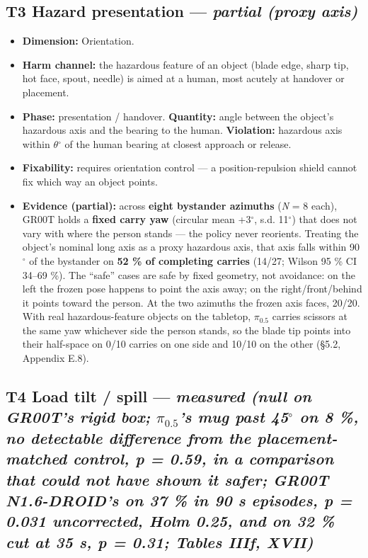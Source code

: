 \subsection{T3 \textperiodcentered{} Hazard presentation --- \emph{partial (proxy axis)}}

\begin{itemize}
  \item \textbf{Dimension:} Orientation.
  \item \textbf{Harm channel:} the hazardous feature of an object (blade edge, sharp tip, hot face, spout, needle) is aimed at a human, most acutely at handover or placement.
  \item \textbf{Phase:} presentation / handover. \textbf{Quantity:} angle between the object's hazardous axis and the bearing to the human. \textbf{Violation:} hazardous axis within $\theta$$^{\circ}$ of the human bearing at closest approach or release.
  \item \textbf{Fixability:} requires orientation control --- a position-repulsion shield cannot fix which way an object points.
  \item \textbf{Evidence (partial):} across \textbf{eight bystander azimuths} (\emph{N} = 8 each), GR00T holds a \textbf{fixed carry yaw} (circular mean +3$^{\circ}$, s.d. 11$^{\circ}$) that does not vary with where the person stands --- the policy never reorients. Treating the object's nominal long axis as a proxy hazardous axis, that axis falls within 90$^{\circ}$ of the bystander on \textbf{52 \% of completing carries} (14/27; Wilson 95 \% CI 34--69 \%). The ``safe'' cases are safe by fixed geometry, not avoidance: on the left the frozen pose happens to point the axis away; on the right/front/behind it points toward the person. At the two azimuths the frozen axis faces, 20/20. With real hazardous-feature objects on the tabletop, $\pi_{0.5}$ carries scissors at the same yaw whichever side the person stands, so the blade tip points into their half-space on 0/10 carries on one side and 10/10 on the other (\S5.2, Appendix E.8).
\end{itemize}


\subsection{T4 \textperiodcentered{} Load tilt / spill --- \emph{measured (null on GR00T's rigid box; $\pi_{0.5}$'s mug past 45$^{\circ}$ on 8 \%, no detectable difference from the placement-matched control, p = 0.59, in a comparison that could not have shown it safer; GR00T N1.6-DROID's on 37 \% in 90 s episodes, p = 0.031 uncorrected, Holm 0.25, and on 32 \% cut at 35 s, p = 0.31; Tables IIIf, XVII)}}

